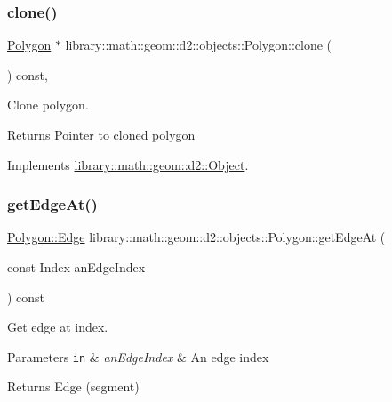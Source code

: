 \subsubsection{\texorpdfstring{clone()}{clone()}}
{\footnotesize\ttfamily \hyperlink{classlibrary_1_1math_1_1geom_1_1d2_1_1objects_1_1_polygon}{Polygon} $\ast$ library\+::math\+::geom\+::d2\+::objects\+::\+Polygon\+::clone (\begin{DoxyParamCaption}{ }\end{DoxyParamCaption}) const\hspace{0.3cm}{\ttfamily [override]}, {\ttfamily [virtual]}}



Clone polygon. 

\begin{DoxyReturn}{Returns}
Pointer to cloned polygon 
\end{DoxyReturn}


Implements \hyperlink{classlibrary_1_1math_1_1geom_1_1d2_1_1_object_a5c26ae4120edb24f6463d65a9cef247d}{library\+::math\+::geom\+::d2\+::\+Object}.

\mbox{\label{classlibrary_1_1math_1_1geom_1_1d2_1_1objects_1_1_polygon_a92d93fe3b0f2d2b17b393475f3e1c090}} 
\subsubsection{\texorpdfstring{get\+Edge\+At()}{getEdgeAt()}}
{\footnotesize\ttfamily \hyperlink{classlibrary_1_1math_1_1geom_1_1d2_1_1objects_1_1_polygon_a17e3083d71685e16f3244298e6f44ad9}{Polygon\+::\+Edge} library\+::math\+::geom\+::d2\+::objects\+::\+Polygon\+::get\+Edge\+At (\begin{DoxyParamCaption}\item[{const Index}]{an\+Edge\+Index }\end{DoxyParamCaption}) const}



Get edge at index. 


\begin{DoxyParams}[1]{Parameters}
\mbox{\tt in}  & {\em an\+Edge\+Index} & An edge index \\
\hline
\end{DoxyParams}
\begin{DoxyReturn}{Returns}
Edge (segment) 
\end{DoxyReturn}
\mbox{\label{classlibrary_1_1math_1_1geom_1_1d2_1_1objects_1_1_polygon_ac01b8f978e663f09ef0f7a91de7720ce}} 

